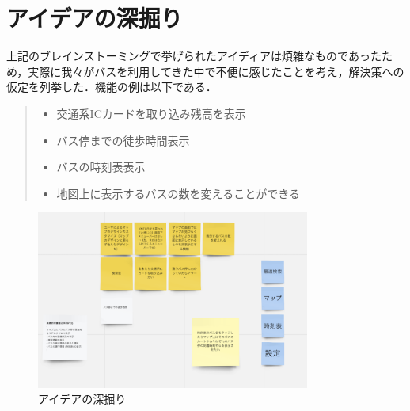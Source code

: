 \section{アイデアの深掘り}

上記のブレインストーミングで挙げられたアイディアは煩雑なものであったため，実際に我々がバスを利用してきた中で不便に感じたことを考え，解決策への仮定を列挙した．機能の例は以下である．

\begin{quote}
    \begin{itemize}
        \item 交通系ICカードを取り込み残高を表示
        \item バス停までの徒歩時間表示
        \item バスの時刻表表示
        \item 地図上に表示するバスの数を変えることができる
    \end{itemize}
\end{quote}

\begin{figure}[htbp]
    \centering
    \includegraphics[width=9cm]{images/dig.png}
    \caption{アイデアの深掘り}
    \label{fig:dig}
\end{figure}

